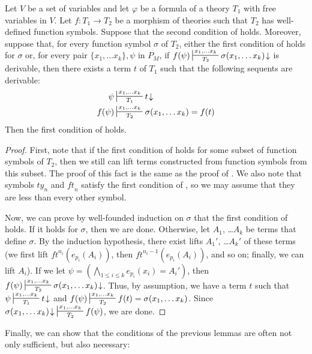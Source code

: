 \documentclass[reqno]{amsart}
\theoremstyle{definition}
\theoremstyle{remark}
\newcommand{\ft}{\mathit{ft}}
\newcommand{\ty}{\mathit{ty}}
\numberwithin{figure}{section}
\begin{document}
\begin{lem}
Let $V$ be a set of variables and let $\varphi$ be a formula of a theory $T_1$ with free variables in $V$.
Let $f : T_1 \to T_2$ be a morphism of theories such that $T_2$ has well-defined function symbols.
Suppose that the second condition of  holds.
Moreover, suppose that, for every function symbol $\sigma$ of $T_2$, either the first condition of  holds for $\sigma$ or,
for every pair $\{ x_1, \ldots x_k \},\psi$ in $P_M$, if $f(\psi) \sststile{T_2}{x_1, \ldots x_k} \sigma(x_1, \ldots x_k)\!\downarrow$ is derivable, then there exists a term $t$ of $T_1$ such that the following sequents are derivable:
\begin{align*}
\psi & \sststile{T_1}{x_1, \ldots x_k} t\!\downarrow \\
f(\psi) & \sststile{T_2}{x_1, \ldots x_k} \sigma(x_1, \ldots x_k) = f(t)
\end{align*}
Then the first condition of  holds.
\end{lem}
\begin{proof}
First, note that if the first condition of  holds for some subset of function symbols of $T_2$, then we still can lift terms constructed from function symbols from this subset.
The proof of this fact is the same as the proof of .
We also note that symbols $\ty_n$ and $\ft_n$ satisfy the first condition of , so we may assume that they are less than every other symbol.

Now, we can prove by well-founded induction on $\sigma$ that the first condition of  holds.
If it holds for $\sigma$, then we are done.
Otherwise, let $A_1$, \ldots $A_k$ be terms that define $\sigma$.
By the induction hypothesis, there exist lifts $A_1'$, \ldots $A_k'$ of these terms (we first lift $\ft^{n_i}(e_{p_i}(A_i))$, then $\ft^{n_i-1}(e_{p_i}(A_i))$, and so on; finally, we can lift $A_i$).
If we let $\psi = (\bigwedge_{1 \leq i \leq k} e_{p_i}(x_i) = A_i')$, then $f(\psi) \sststile{T_2}{x_1, \ldots x_k} \sigma(x_1, \ldots x_k)\!\downarrow$.
Thus, by assumption, we have a term $t$ such that $\psi \sststile{T_1}{x_1, \ldots x_k} t\!\downarrow$ and $f(\psi) \sststile{T_2}{x_1, \ldots x_k} f(t) = \sigma(x_1, \ldots x_k)$.
Since $\sigma(x_1, \ldots x_k)\!\downarrow\ \sststile{T_2}{x_1, \ldots x_k} f(\psi)$, we are done.
\end{proof}

Finally, we can show that the conditions of the previous lemmas are often not only sufficient, but also necessary:
\end{document}
